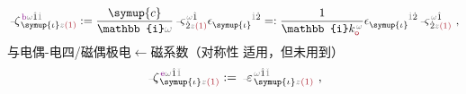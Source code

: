 \begin{align} \label{eq:m<-p}
	\xint{\begin{smallmatrix} ~ \\ {}^{}_{\mathcolor{gray}{-}} \\ ~ \end{smallmatrix}}{12}{\zeta}^{\;\! \textcolor{Plum}{\text{b}} \mathcolor{gray}{\omega} \hat{1} \mathcolor{gray}{\dot{1}}}_{\;\! \symup{\iota} \mathcolor{gray}{z} \textcolor{Maroon}{(1)}} := \frac{\symup{c}}{\mathbb{i} \mathcolor{gray}{\omega}} \xint{\begin{smallmatrix} ~ \\ {}^{}_{\mathcolor{gray}{-}} \\ ~ \end{smallmatrix}}{13}{\varsigma}^{\;\! \mathcolor{gray}{\omega} \hat{1}}_{\;\! \dot{2} \mathcolor{gray}{z} \textcolor{Maroon}{(1)}} \epsilon^{\hphantom{\symup{\iota}}\mathcolor{gray}{\dot{1}}\dot{2}}_{\symup{\iota}} =: \frac{1}{\mathbb{i} k_{\textcolor{Maroon}{\mathsf{o}}}^{\;\! \mathcolor{gray}{\omega}}} \epsilon^{\hphantom{\symup{\iota}}\mathcolor{gray}{\dot{1}}\dot{2}}_{\symup{\iota}} \xint{\begin{smallmatrix} ~ \\ {}^{}_{\mathcolor{gray}{-}} \\ ~ \end{smallmatrix}}{13}{\varsigma}^{\;\! \mathcolor{gray}{\omega} \hat{1}}_{\;\! \dot{2} \mathcolor{gray}{z} \textcolor{Maroon}{(1)}} ~,
\end{align}
与\textcolor{NavyBlue}{电偶-电四/磁偶}极\textcolor{NavyBlue}{电$\longleftarrow$磁}系数（对称性  适用，但未用到）
\abovedisplayskip=3pt
\belowdisplayskip=5pt
\begin{align} \label{eq:p<-q/m}
	\xint{\begin{smallmatrix} ~ \\ {}^{}_{\mathcolor{gray}{-}} \\ ~ \end{smallmatrix}}{12}{\zeta}^{\;\! \textcolor{Plum}{\text{e}} \mathcolor{gray}{\omega} \hat{1} \mathcolor{gray}{\check{1}}}_{\;\! \symup{\iota} \mathcolor{gray}{z} \textcolor{Maroon}{(1)}} := \xint{\begin{smallmatrix} ~ \\ {}^{}_{\mathcolor{gray}{-}} \\ ~ \end{smallmatrix}}{16}{\varepsilon}^{\;\! \mathcolor{gray}{\omega} \hat{1} \mathcolor{gray}{\check{1}}}_{\;\! \symup{\iota} \mathcolor{gray}{z} \textcolor{Maroon}{(1)}} ~,
\end{align}
